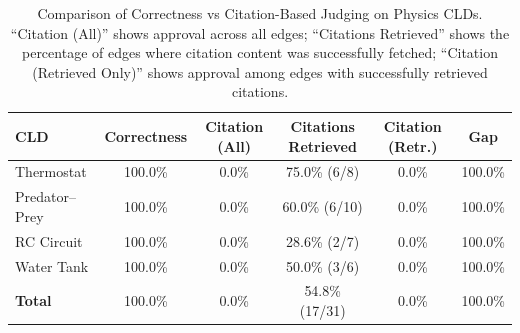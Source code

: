 \begin{table}[htbp]
\centering
\caption{Comparison of Correctness vs Citation-Based Judging on Physics CLDs. 
``Citation (All)'' shows approval across all edges; ``Citations Retrieved'' shows the percentage of edges 
where citation content was successfully fetched; ``Citation (Retrieved Only)'' shows approval among edges 
with successfully retrieved citations.}
\label{tab:physics-comparison-enhanced}
\begin{tabular}{lccccc}
\toprule
\textbf{CLD} & \textbf{Correctness} & \textbf{Citation (All)} & \textbf{Citations Retrieved} & \textbf{Citation (Retr.)} & \textbf{Gap} \\
\midrule
Thermostat & 100.0\% & 0.0\% & 75.0\% (6/8) & 0.0\% & 100.0\% \\
Predator--Prey & 100.0\% & 0.0\% & 60.0\% (6/10) & 0.0\% & 100.0\% \\
RC Circuit & 100.0\% & 0.0\% & 28.6\% (2/7) & 0.0\% & 100.0\% \\
Water Tank & 100.0\% & 0.0\% & 50.0\% (3/6) & 0.0\% & 100.0\% \\
\midrule
\textbf{Total} & 100.0\% & 0.0\% & 54.8\% (17/31) & 0.0\% & 100.0\% \\
\bottomrule
\end{tabular}
\end{table}
